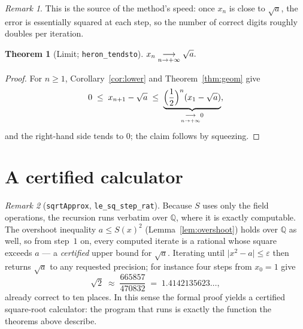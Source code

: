 \documentclass[11pt]{article}
\theoremstyle{plain}
\newtheorem{theorem}{Theorem}[section]
\theoremstyle{definition}
\theoremstyle{remark}
\newtheorem*{remark}{Remark}
\newcommand{\Q}{\mathbb{Q}}
\begin{document}
\begin{remark}
This is the source of the method's speed: once $x_n$ is close to $\sqrt{a}$, the error is
essentially squared at each step, so the number of correct digits roughly doubles per
iteration.
\end{remark}

\begin{theorem}[Limit; \texttt{heron\_tendsto}]\label{thm:lim}
\(
  \tendsto{x_n}[n \to +\infty]{\sqrt{a}}.
\)
\end{theorem}

\begin{proof}
For $n\geq 1$, Corollary~\ref{cor:lower} and Theorem~\ref{thm:geom} give
\[
  0\;\leq\;x_{n+1}-\sqrt{a}\;\leq\;\underset{\tendsto{}[n\to+\infty]{0}}{\underbrace{\Bigl(\frac{1}{2}\Bigr)^n(x_1-\sqrt{a})}},
\]
and the right-hand side tends to $0$; the claim follows by squeezing.
\end{proof}

\section{A certified calculator}\label{sec:calc}

\begin{remark}[\texttt{sqrtApprox}, \texttt{le\_sq\_step\_rat}]
Because $S$ uses only the field operations, the recursion runs verbatim over $\Q$, where it
is exactly computable. The overshoot inequality $a\leq S(x)^2$ (Lemma~\ref{lem:overshoot})
holds over $\Q$ as well, so from step~$1$ on, every computed iterate is a rational whose
square exceeds $a$ --- a \emph{certified} upper bound for $\sqrt{a}$. Iterating until
$\vert x^2-a\vert\leq\varepsilon$ then returns $\sqrt{a}$ to any requested precision; for
instance four steps from $x_0=1$ give
\[
  \sqrt{2}\;\approx\;\frac{665857}{470832}\;=\;1.4142135623\ldots,
\]
already correct to ten places. In this sense the formal proof yields a certified
square-root calculator: the program that runs is exactly the function the theorems above
describe.
\end{remark}
\end{document}
